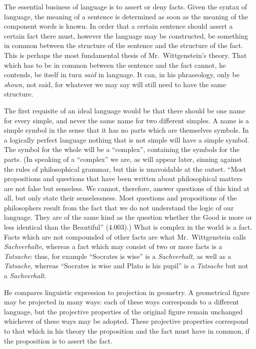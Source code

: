 The essential business of language is to assert or deny facts. Given the syntax of language, the meaning of a sentence is determined as soon as the meaning of the component words is known. In order that a certain sentence should assert a certain fact there must, however the language may be constructed, be something in common between the structure of the sentence and the structure of the fact. This is perhaps the most fundamental thesis of Mr.\ Wittgenstein’s theory. That which has to be in common between the sentence and the fact cannot, he contends, be itself in turn \emph{said} in language. It can, in his phraseology, only be \emph{shown}, not said, for whatever we may say will still need to have the same structure.

The first requisite of an ideal language would be that there should be one name for every simple, and never the same name for two different simples. A name is a simple symbol in the sense that it has no parts which are themselves symbols. In a logically perfect language nothing that is not simple will have a simple symbol. The symbol for the whole will be a “complex”, containing the symbols for the parts. (In speaking of a “complex” we are, as will appear later, sinning against the rules of philosophical grammar, but this is unavoidable at the outset. “Most propositions and questions that have been written about philosophical matters are not false but senseless. We cannot, therefore, answer questions of this kind at all, but only state their senselessness. Most questions and propositions of the philosophers result from the fact that we do not understand the logic of our language. They are of the same kind as the question whether the Good is more or less identical than the Beautiful” (4.003).) What is complex in the world is a fact. Facts which are not compounded of other facts are what Mr.\ Wittgenstein calls \emph{Sachverhalte}, whereas a fact which may consist of two or more facts is a \emph{Tatsache}: thus, for example “Socrates is wise” is a \emph{Sachverhalt}, as well as a \emph{Tatsache}, whereas “Socrates is wise and Plato is his pupil” is a \emph{Tatsache} but not a \emph{Sachverhalt}.

He compares linguistic expression to projection in geometry. A geometrical figure may be projected in many ways: each of these ways corresponds to a different language, but the projective properties of the original figure remain unchanged whichever of these ways may be adopted. These projective properties correspond to that which in his theory the proposition and the fact must have in common, if the proposition is to assert the fact.

